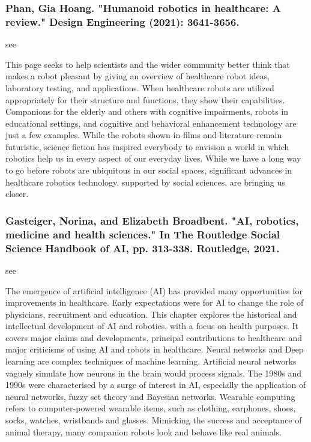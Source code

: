 \documentclass[conference]{IEEEtran}
\begin{document}
\medskip
\subsubsection{Phan, Gia Hoang. "Humanoid robotics in healthcare: A review." Design Engineering (2021): 3641-3656.
}
see \cite{phan2021humanoid}

This page seeks to help scientists and the wider community better think that makes a robot pleasant by giving an overview of healthcare robot ideas, laboratory testing, and applications. When healthcare robots are utilized appropriately for their structure and functions, they show their capabilities. Companions for the elderly and others with cognitive impairments, robots in educational settings, and cognitive and behavioral enhancement technology are just a few examples. While the robots shown in films and literature remain futuristic, science fiction has inspired everybody to envision a world in which robotics help us in every aspect of our everyday lives. While we have a long way to go before robots are ubiquitous in our social spaces, significant advances in healthcare robotics technology, supported by social sciences, are bringing us closer.

\medskip
\subsubsection{Gasteiger, Norina, and Elizabeth Broadbent. "AI, robotics, medicine and health sciences." In The Routledge Social Science Handbook of AI, pp. 313-338. Routledge, 2021.}
see \cite{gasteiger2021ai}

The emergence of artificial intelligence (AI) has provided many opportunities for improvements in healthcare. Early expectations were for AI to change the role of physicians, recruitment and education. This chapter explores the historical and intellectual development of AI and robotics, with a focus on health purposes. It covers major claims and developments, principal contributions to healthcare and major criticisms of using AI and robots in healthcare. Neural networks and Deep learning are complex techniques of machine learning. Artificial neural networks vaguely simulate how neurons in the brain would process signals. The 1980s and 1990s were characterised by a surge of interest in AI, especially the application of neural networks, fuzzy set theory and Bayesian networks. Wearable computing refers to computer-powered wearable items, such as clothing, earphones, shoes, socks, watches, wristbands and glasses. Mimicking the success and acceptance of animal therapy, many companion robots look and behave like real animals.
\end{document}
